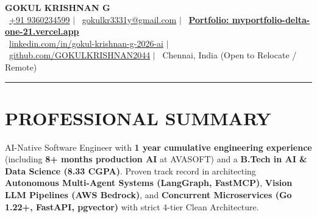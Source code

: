 \documentclass[letterpaper,10pt]{article}
\begin{document}
\begin{center}
  {\Huge\textbf{\color{accentblue}GOKUL KRISHNAN G}}\\[3pt]
  \small\color{darkgray}
  \ \href{tel:+919360234599}{+91 9360234599} \enspace$|$\enspace
  \ \href{mailto:gokulkr3331y@gmail.com}{gokulkr3331y@gmail.com} \enspace$|$\enspace
  \ \href{https://myportfolio-delta-one-21.vercel.app/}{\textbf{\color{accentblue}Portfolio: myportfolio-delta-one-21.vercel.app}} \\[3pt]
  \ \href{https://www.linkedin.com/in/gokul-krishnan-g-2026-ai/}{linkedin.com/in/gokul-krishnan-g-2026-ai} \enspace$|$\enspace
  \ \href{https://github.com/GOKULKRISHNAN2044}{github.com/GOKULKRISHNAN2044} \enspace$|$\enspace
  \ Chennai, India (Open to Relocate / Remote)
\end{center}
\vspace{-2pt}
{\color{accentblue}\rule{\linewidth}{1.2pt}}
\vspace{2pt}

\section{PROFESSIONAL SUMMARY}
\small{AI-Native Software Engineer with \textbf{1 year cumulative engineering experience} (including \textbf{8+ months production AI} at AVASOFT) and a \textbf{B.Tech in AI \& Data Science (8.33 CGPA)}. Proven track record in architecting \textbf{Autonomous Multi-Agent Systems (LangGraph, FastMCP)}, \textbf{Vision LLM Pipelines (AWS Bedrock)}, and \textbf{Concurrent Microservices (Go 1.22+, FastAPI, pgvector)} with strict 4-tier Clean Architecture.}

\end{document}
